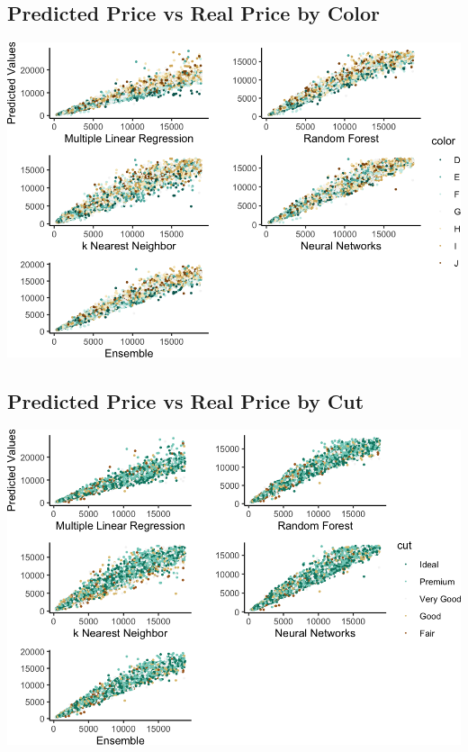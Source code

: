 \documentclass[
  paper=a4,
  ,captions=tableheading
]{scrartcl}
\begin{document}
\hypertarget{predicted-price-vs-real-price-by-color}{%
\subsection{Predicted Price vs Real Price by
Color}\label{predicted-price-vs-real-price-by-color}}

\begin{center}\includegraphics{Diamonds_PDF_files/figure-latex/Summ Color Plots-1} \end{center}

\hypertarget{predicted-price-vs-real-price-by-cut}{%
\subsection{Predicted Price vs Real Price by
Cut}\label{predicted-price-vs-real-price-by-cut}}

\begin{center}\includegraphics{Diamonds_PDF_files/figure-latex/Summ Cut Plots-1} \end{center}
\end{document}

